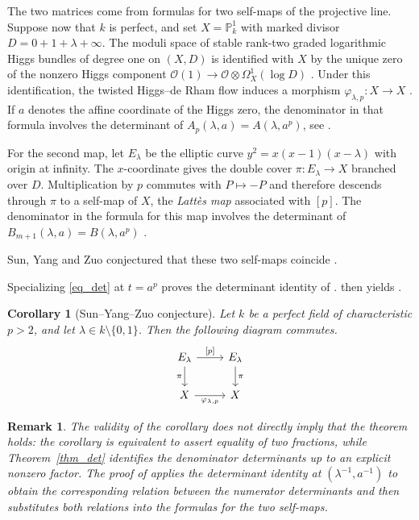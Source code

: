 \documentclass{amsart}
\newtheorem{corollary}[theorem]{Corollary}
\newtheorem*{remark}{Remark}
\numberwithin{equation}{section}
\newcommand{\PP}{\mathbb P}
\newcommand{\OO}{\mathcal O}
\begin{document}
The two matrices come from formulas for two self-maps of the projective line. Suppose now that $k$ is
perfect, and set $X=\PP^1_k$ with marked divisor
$D=0+1+\lambda+\infty$. The moduli space of stable rank-two
graded logarithmic Higgs bundles of degree one on $(X,D)$
is identified with $X$ by the unique zero of the nonzero
Higgs component
$\OO(1)\to\OO\otimes\Omega_X^1(\log D)$
\cite[\S4.1 and~\S4.3]{SYZ}. Under this identification, the
twisted Higgs--de Rham flow induces a morphism
$\varphi_{\lambda,p}\colon X\to X$ \cite[\S4.2 and Appendix A.1]{SYZ}.
If $a$ denotes the affine coordinate of the Higgs zero,
the denominator in that formula involves the determinant
of $A_p(\lambda,a)=A(\lambda,a^p)$, see \cite[Apendix~A and Theorem~A.5]{SYZ}.

For the second map, let $E_\lambda$ be the elliptic curve
$y^2=x(x-1)(x-\lambda)$ with origin at infinity. The
$x$-coordinate gives the double cover
$\pi\colon E_\lambda\to X$ branched over $D$.
Multiplication by $p$ commutes with $P\mapsto-P$ and
therefore descends through $\pi$ to a self-map of $X$,
the \emph{Latt\`es map} associated with $[p]$. The
denominator in the formula for this map involves the
determinant of $B_{m+1}(\lambda,a)=B(\lambda,a^p)$
\cite[Theorem~A.8]{SYZ}.

Sun, Yang and Zuo conjectured that these two self-maps
coincide \cite[Conjecture~4.8]{SYZ}.

Specializing \eqref{eq_det} at $t=a^p$ proves the determinant
identity of \cite[Conjecture~A.1]{SYZ}. 
\cite[Proposition~A.9]{SYZ} then yields \cite[Conjecture~4.8]{SYZ}.

\begin{corollary}[Sun--Yang--Zuo conjecture]\label{cor:syz}
Let $k$ be a perfect field of characteristic $p>2$, and
let $\lambda\in k\setminus\{0,1\}$. Then the following
diagram commutes.
\[
  \begin{tikzcd}
    E_\lambda \arrow[r,"{[p]}"] \arrow[d,"\pi"'] &
    E_\lambda \arrow[d,"\pi"] \\
    X \arrow[r,"\varphi_{\lambda,p}"'] & X
  \end{tikzcd}
\]
\end{corollary}

\begin{remark}
 The validity of the corollary does not directly imply that the theorem holds: the corollary is equivalent to assert equality of two fractions, while Theorem~\ref{thm_det} identifies the denominator determinants
up to an explicit nonzero factor.
The proof of \cite[Proposition~A.9]{SYZ} applies the determinant
identity at $(\lambda^{-1},a^{-1})$ to obtain the corresponding
relation between the numerator determinants and then substitutes
both relations into the formulas for the two self-maps.
\end{remark}
\end{document}
